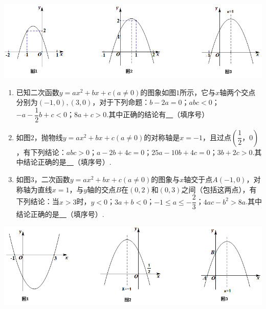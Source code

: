 \documentclass[10pt]{ctexart}
\begin{document}
\includegraphics[scale=0.6]{figure/g-6.PNG} 
\begin{jply}{}{}
    \begin{enumerate}[(1)]
  \item 已知二次函数$y=ax^2+bx+c(a\neq 0)$的图象如图$1$所示，它与$x$轴两个交点分别为$(-1,0),(3,0)$，对于下列命题：$b-2a=0$；$abc<0$；$-a-\dfrac{1}{2}b+c<0$；$8a+c>0$.其中正确的结论有\underline{~\hspace{1cm}~}（填序号）
  \item 如图$2$，抛物线$y=ax^2+bx+c(a\neq 0)$的对称轴是$x=-1$，且过点$(\dfrac{1}{2}，0)$，有下列结论：$abc>0$；$a-2b+4c=0$；$25a-10b+4c=0$；$3b+2c>0$.其中结论正确的是\underline{~\hspace{1cm}~}（填序号）.
  \item 如图$3$，二次函数$y=ax^2+bx+c(a\neq 0)$的图象与$x$轴交于点$A(-1,0)$，对称轴为直线$x=1$，与$y$轴的交点$B$在$(0,2)$和$(0,3)$之间（包括这两点），有下列结论：当$x>3$时，$y<0$；$3a+b<0$；$-1\leq a\leq -\dfrac{2}{3}$；$4ac-b^2>8a$.其中结论正确的是\underline{~\hspace{1cm}~}（填序号）.
  \end{enumerate}
\end{jply}

\includegraphics[scale=0.6]{figure/g-7.PNG} 
\end{document}
